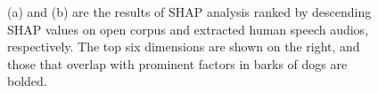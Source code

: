 \begin{figure}[th]
	\centering
	\caption{(a) and (b) are the results of SHAP analysis ranked by descending SHAP values on open corpus and extracted human speech audios, respectively. The top six dimensions are shown on the right, 
and those that overlap with prominent factors in barks of dogs are bolded.
}
	\label{fig:humanspeech}
\end{figure}



